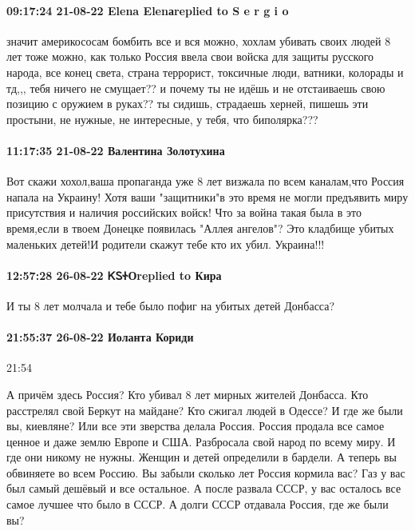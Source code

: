 \paragraph{09:17:24 21-08-22 Elena Elenаreplied to S e r g i o}

значит америкососам бомбить все и вся можно, хохлам убивать своих людей 8 лет
тоже можно, как только Россия ввела свои войска для защиты русского народа, все
конец света, страна террорист, токсичные люди, ватники, колорады и тд,,, тебя
ничего не смущает?? и почему ты не идёшь и не отстаиваешь свою позицию с
оружием в руках?? ты сидишь, страдаешь херней, пишешь эти простыни, не нужные,
не интересные, у тебя, что биполярка???

\paragraph{11:17:35 21-08-22 Валентина Золотухина}

Вот скажи хохол,ваша пропаганда уже 8 лет визжала по всем каналам,что Россия
напала на Украину! Хотя ваши "защитники"в это время не могли предъявить миру
присутствия и наличия российских войск! Что за война такая была в это
время,если в твоем Донецке появилась "Аллея ангелов"? Это кладбище убитых
маленьких детей!И родители скажут тебе кто их убил. Украина!!!

\paragraph{12:57:28 26-08-22 ᏦᏚᏐОreplied to Кира}

И ты 8 лет молчала и тебе было пофиг на убитых детей Донбасса?

\paragraph{21:55:37 26-08-22 Иоланта Кориди}
21:54

А причём здесь Россия? Кто убивал 8 лет мирных жителей Донбасса. Кто расстрелял
свой Беркут на майдане? Кто сжигал людей в Одессе? И где же были вы, киевляне?
Или все эти зверства делала Россия. Россия продала все самое ценное и даже
землю Европе и США. Разбросала свой народ по всему миру. И где они никому не
нужны. Женщин и детей определили в бардели. А теперь вы обвиняете во всем
Россию. Вы забыли сколько лет Россия кормила вас? Газ у вас был самый дешёвый и
все остальное. А после развала СССР, у вас осталось все самое лучшее что было в
СССР. А долги СССР отдавала Россия, где же были вы?

